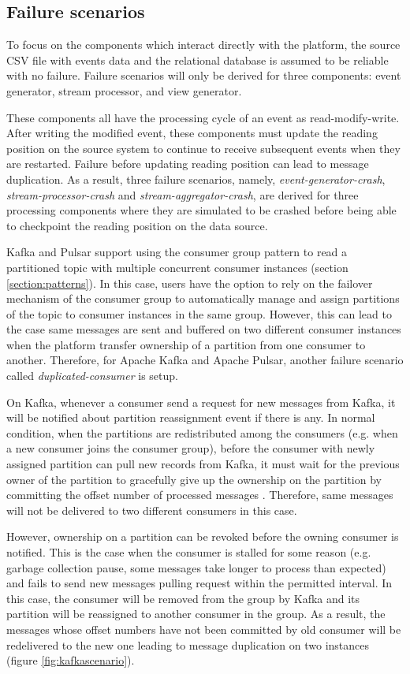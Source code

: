  
\subsection{Failure scenarios}
To focus on the components which interact directly with the platform, the source CSV file with events data and the relational database is assumed to be reliable with no failure. Failure scenarios will only be derived for three components: event generator, stream processor, and view generator.

These components all have the processing cycle of an event as read-modify-write. After writing the modified event, these components must update the reading position on the source system to continue to receive subsequent events when they are restarted. Failure before updating reading position can lead to message duplication. As a result, three failure scenarios, namely, \emph{event-generator-crash}, \emph{stream-processor-crash} and \emph{stream-aggregator-crash}, are derived for three processing components where they are simulated to be crashed before being able to checkpoint the reading position on the data source. 

Kafka and Pulsar support using the consumer group pattern to read a partitioned topic with multiple concurrent consumer instances (section \ref{section:patterns}). In this case, users have the option to rely on the failover mechanism of the consumer group to automatically manage and assign partitions of the topic to consumer instances in the same group. However, this can lead to the case same messages are sent and buffered on two different consumer instances when the platform transfer ownership of a partition from one consumer to another. Therefore, for Apache Kafka and Apache Pulsar, another failure scenario called \emph{duplicated-consumer} is setup.

On Kafka, whenever a consumer send a request for new messages from Kafka, it will be notified about partition reassignment event if there is any. In normal condition, when the partitions are redistributed among the consumers (e.g. when a new consumer joins the consumer group), before the consumer with newly assigned partition can pull new records from Kafka, it must wait for the previous owner of the partition to gracefully give up the ownership on the partition by committing the offset number of processed messages \cite{kafkaconsumerimplement}. Therefore, same messages will not be delivered to two different consumers in this case. 

However, ownership on a partition can be revoked before the owning consumer is notified. This is the case when the consumer is stalled for some reason (e.g. garbage collection pause, some messages take longer to process than expected) and fails to send new messages pulling request within the permitted interval. In this case, the consumer will be removed from the group by Kafka and its partition will be reassigned to another consumer in the group. As a result, the messages whose offset numbers have not been committed by old consumer will be redelivered to the new one leading to message duplication on two instances (figure \ref{fig:kafkascenario}). 

